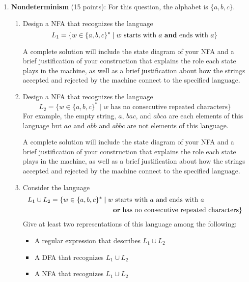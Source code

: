\begin{enumerate}[wide, labelwidth=!, labelindent=0pt]
\begin{enumerate}
    {\it Hint: sometimes rewriting the defining membership condition for a set in different ways helps us find alternate representations of that set.}
    \end{enumerate}


\item \textbf{Nondeterminism} (15 points): For this question, the alphabet is $\{a,b,c\}$.
\begin{enumerate}
\item\gradeComplete Design a NFA that recognizes the language
    \[ 
    L_1 = \{w \in \{a,b,c\}^* \mid w \text{ starts with $a$ {\bf and} ends with $a$}\}
    \]

    A complete solution will include the state diagram of your NFA and 
    a brief justification 
    of your construction that explains the role each state plays in the machine, as well as a brief 
    justification about how the strings accepted and rejected by the machine connect to the specified language.

\item\gradeCorrect Design a NFA that recognizes the language 
    \[ 
    L_2 = \{w \in \{a,b,c\}^* \mid w \text{ has no consecutive repeated characters}\}
    \]
    For example, the empty string, $a$, $bac$, and $abca$ are each elements of this language but $aa$ and $abb$ and $abbc$ are not elements of this language.

    A complete solution will include the state diagram of your NFA and 
    a brief justification 
    of your construction that explains the role each state plays in the machine, as well as a brief 
    justification about how the strings accepted and rejected by the machine connect to the specified language.

\item\gradeComplete Consider the language
\begin{align*}
L_1 \cup L_2 = \{w \in \{a,b,c\}^* \mid w &\text{ starts with $a$ and ends with $a$} \\
&\text{{\bf or} has no consecutive repeated characters}\}
\end{align*}
Give at least two representations of this language among the following: 
\begin{itemize}
\item A regular expression that describes $L_1 \cup L_2$
\item A DFA that recognizes $L_1 \cup L_2$
\item A NFA that recognizes $L_1 \cup L_2$
\end{itemize}


\end{enumerate}
\end{enumerate}
